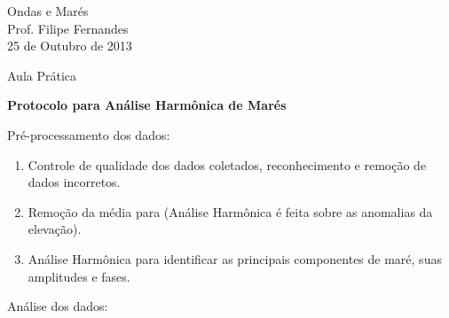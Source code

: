 \documentclass[11pt,portuguese,a4paper,pdftex]{article}
\begin{document}
{\Large
\begin{center}
  Ondas e Marés\\
  \vspace{0.3 cm}
  Prof. Filipe Fernandes\\
  25 de Outubro de 2013\\
\end{center}
}

\begin{center}
  {\Large Aula Prática}
\end{center}

 \begin{center}
{\bf \Large Protocolo para Análise Harmônica de Marés}\\
  \end{center}

\vspace{0.5cm}

\hspace{-8mm} Pré-processamento dos dados:

\begin{enumerate}
  \item Controle de qualidade dos dados coletados, reconhecimento e remoção de
        dados incorretos.

  \item Remoção da média para (Análise Harmônica é feita sobre as anomalias da
        elevação).

  \item Análise Harmônica para identificar as principais componentes de maré,
        suas amplitudes e fases.
\end{enumerate}

\hspace{-8mm} Análise dos dados:
\end{document}
